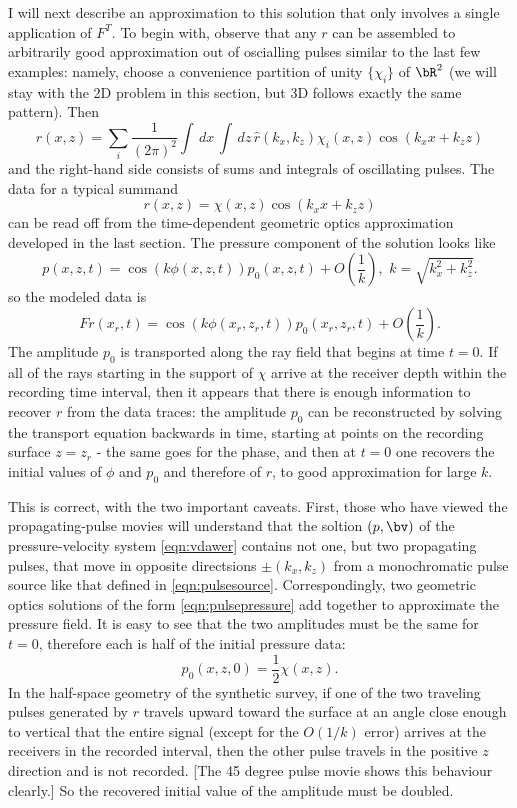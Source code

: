 I will next describe an approximation to this solution that only involves a single application of $F^T$. To begin with, observe that any $r$ can be assembled to arbitrarily good approximation out of oscialling pulses similar to the last few examples: namely, choose a convenience partition of unity $\{\chi_i\}$ of $\bR^2$ (we will stay with the 2D problem in this section, but 3D follows exactly the same pattern). Then
\[
r(x,z) = \sum_i \frac{1}{(2\pi)^2}\int\,dx\,\int\,dz\,\hat{r}(k_x,k_z) \chi_i(x,z)\cos(k_x x + k_z z)
\]
and the right-hand side consists of sums and integrals of oscillating pulses. The data for a typical summand 
\begin{equation}
\label{eqn:pulsesource}
r(x,z) = \chi(x,z)\cos(k_x x + k_z z) 
\end{equation}
can be read off from the time-dependent geometric optics approximation developed in the last section. The pressure component of the solution looks like
\begin{equation}
\label{eqn:pulsepressure}
p(x,z,t) =  \cos(k \phi(x,z,t)) p_0(x,z,t) + O\left(\frac{1}{k}\right),\,\,k=\sqrt{k_x^2+k_z^2}.
\end{equation}
so the modeled data is
\begin{equation}
\label{eqn:pulsedata}
Fr(x_r,t) = \cos(k \phi(x_r,z_r,t)) p_0(x_r,z_r,t) + O\left(\frac{1}{k}\right).
\end{equation}
The amplitude $p_0$ is transported along the ray field that begins at time $t=0$. If all of the rays starting in the support of $\chi$ arrive at the receiver depth within the recording time interval, then it appears that there is enough information to recover $r$ from the data traces: the amplitude $p_0$ can be reconstructed by solving the transport equation backwards in time, starting at points on the recording surface $z=z_r$ - the same goes for the phase, and then at $t=0$ one recovers the initial values of $\phi$ and $p_0$ and therefore of $r$, to good approximation for large $k$.

This is correct, with the two important caveats. First, those who have viewed the propagating-pulse movies will understand that the soltion $(p,\bv)$ of the pressure-velocity system \ref{eqn:vdawer} contains not one, but two propagating pulses, that move in opposite directsions $\pm (k_x,k_z)$ from a monochromatic pulse source like that defined in \ref{eqn:pulsesource}. Correspondingly, two geometric optics solutions of the form \ref{eqn:pulsepressure} add together to approximate the pressure field. It is easy to see that the two amplitudes must be the same for $t=0$, therefore each is half of the initial pressure data:
\[
p_0(x,z,0) = \frac{1}{2}\chi(x,z).
\]
In the half-space geometry of the synthetic survey, if one of the two traveling pulses generated by $r$ travels upward toward the surface at an angle close enough to vertical that the entire signal (except for the $O(1/k)$ error) arrives at the receivers in the recorded interval, then the other pulse travels in the positive $z$ direction and is not recorded. [The 45 degree pulse movie shows this behaviour clearly.] So the recovered initial value of the amplitude must be doubled.

